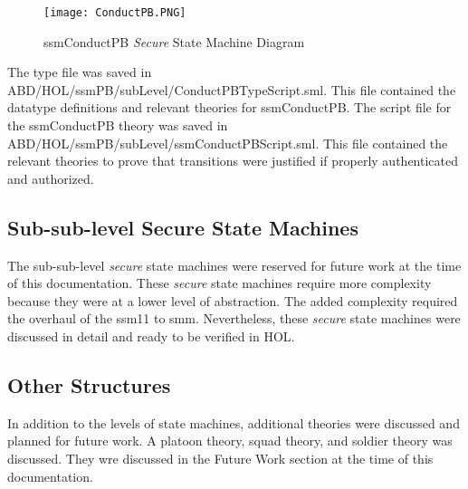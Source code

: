 \begin{figure}[h]
  \centering
  \texttt{[image: ConductPB.PNG]}
  \caption{ssmConductPB \emph{Secure} State Machine Diagram}
\end{figure}

The type file was saved in ABD/HOL/ssmPB/subLevel/ConductPBTypeScript.sml.  This file contained the datatype definitions and relevant theories for ssmConductPB.  The script file for the ssmConductPB theory was saved in ABD/HOL/ssmPB/subLevel/ssmConductPBScript.sml. This file contained the relevant theories to prove that transitions were justified if properly authenticated and authorized.

\subsection{Sub-sub-level Secure State Machines}
\label{sec:sub-sub-level-1}

The sub-sub-level \emph{secure} state machines were reserved for future work at the time of this documentation.  These \emph{secure} state machines require more complexity because they were at a lower level of abstraction.  The added complexity required the overhaul of the ssm11 to smm.  Nevertheless, these \emph{secure} state machines were discussed in detail and ready to be verified in HOL.

\subsection{Other Structures}
\label{sec:other-structures}

In addition to the levels of state machines, additional theories were discussed and planned for future work.  A platoon theory, squad theory, and soldier theory was discussed.  They wre discussed in the Future Work section at the time of this documentation.


